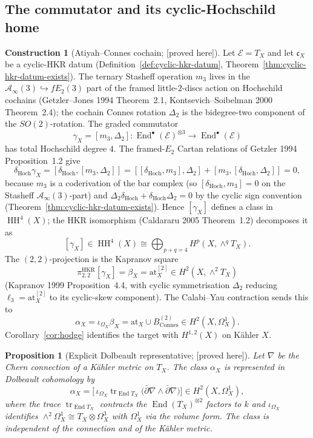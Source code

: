 \documentclass[11pt,reqno]{amsart}
\theoremstyle{plain}
\newtheorem{proposition}[theorem]{Proposition}
\theoremstyle{definition}
\newtheorem{construction}[theorem]{Construction}
\theoremstyle{remark}
\providecommand{\ClaimStatusProvedHere}{\textnormal{[proved here]}}
\DeclareMathOperator{\End}{End}
\DeclareMathOperator{\tr}{tr}
\DeclareMathOperator{\HH}{HH}
\newcommand{\cA}{\mathcal{A}}
\newcommand{\cE}{\mathcal{E}}
\newcommand{\at}{\mathrm{at}}
\begin{document}
\subsection{The commutator and its cyclic-Hochschild home}
\begin{construction}[Atiyah--Connes cochain; \ClaimStatusProvedHere]
\label{constr:cocycle}
Let $\cE=T_X$ and let $\mathfrak c_X$ be a cyclic-HKR datum
(Definition~\ref{def:cyclic-hkr-datum},
Theorem~\ref{thm:cyclic-hkr-datum-exists}). The ternary Stasheff
operation $m_3$ lives in the $\cA_\infty(3)\hookrightarrow fE_2(3)$
part of the framed little-$2$-discs action on Hochschild cochains
(Getzler--Jones 1994 Theorem~2.1, Kontsevich--Soibelman 2000
Theorem~2.4); the cochain Connes rotation $\Delta_2$ is the
bidegree-two component of the $SO(2)$-rotation. The graded commutator
\[
  \gamma_X=[m_3,\Delta_2]:
  \End^\bullet(\cE)^{\otimes 3}\longrightarrow\End^\bullet(\cE)
\]
has total Hochschild degree $4$. The framed-$E_2$ Cartan relations of
Getzler 1994 Proposition~1.2 give
\[
  \delta_{\mathrm{Hoch}}\gamma_X
  =[\delta_{\mathrm{Hoch}},[m_3,\Delta_2]]
  =[[\delta_{\mathrm{Hoch}},m_3],\Delta_2]
  +[m_3,[\delta_{\mathrm{Hoch}},\Delta_2]]
  =0,
\]
because $m_3$ is a coderivation of the bar complex (so
$[\delta_{\mathrm{Hoch}},m_3]=0$ on the Stasheff $\cA_\infty(3)$-part)
and $\Delta_2\delta_{\mathrm{Hoch}}+\delta_{\mathrm{Hoch}}\Delta_2=0$
by the cyclic sign convention
(Theorem~\ref{thm:cyclic-hkr-datum-exists}). Hence $[\gamma_X]$
defines a class in $\HH^4(X)$; the HKR isomorphism (Caldararu 2005
Theorem~1.2) decomposes it as
\[
  [\gamma_X]
  \in\HH^4(X)
  \cong\bigoplus_{p+q=4}H^p(X,\wedge^qT_X).
\]
The $(2,2)$-projection is the Kapranov square
\[
  \pi^{\mathrm{HKR}}_{2,2}[\gamma_X]
  =\beta_X=\at_X^{[2]}
  \in H^2(X,\wedge^2T_X)
\]
(Kapranov 1999 Proposition~4.4, with cyclic symmetrisation $\Delta_2$
reducing $\ell_3=\at_X^{[2]}$ to its cyclic-skew component). The
Calabi--Yau contraction sends this to
\[
  \alpha_X=\iota_{\Omega_X}\beta_X
  =\at_X\cup B^{(2)}_{\mathrm{Connes}}
  \in H^2(X,\Omega^1_X).
\]
Corollary~\ref{cor:hodge} identifies the target with $H^{1,2}(X)$ on
K\"ahler $X$.
\end{construction}

\begin{proposition}[Explicit Dolbeault representative; \ClaimStatusProvedHere]
\label{prop:cocycle-rep}
Let $\nabla$ be the Chern connection of a K\"ahler metric on $T_X$.
The class $\alpha_X$ is represented in Dolbeault cohomology by
\[
  \alpha_X
  =\bigl[\,\iota_{\Omega_X}
    \tr_{\End T_X}\bigl(
      \bar\partial\nabla\wedge\bar\partial\nabla
    \bigr)\bigr]
  \in H^2(X,\Omega^1_X),
\]
where the trace $\tr_{\End T_X}$ contracts the $\End(T_X)^{\otimes 2}$
factors to $k$ and $\iota_{\Omega_X}$ identifies
$\wedge^2\Omega^1_X\cong T_X\otimes\Omega_X^3$ with $\Omega^1_X$ via
the volume form. The class is independent of the connection and of
the K\"ahler metric.
\end{proposition}
\end{document}
